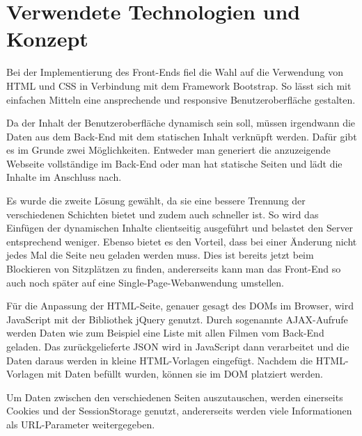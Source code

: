 \section{Verwendete Technologien und Konzept}

Bei der Implementierung des Front-Ends fiel die Wahl auf die Verwendung von \acs{HTML} und \acs{CSS} in Verbindung mit dem Framework Bootstrap.
So lässt sich mit einfachen Mitteln eine ansprechende und responsive Benutzeroberfläche gestalten.

Da der Inhalt der Benutzeroberfläche dynamisch sein soll, müssen irgendwann die Daten aus dem Back-End mit dem statischen Inhalt verknüpft werden.
Dafür gibt es im Grunde zwei Möglichkeiten.
Entweder man generiert die anzuzeigende Webseite vollständige im Back-End oder man hat statische Seiten und lädt die Inhalte im Anschluss nach.

Es wurde die zweite Lösung gewählt, da sie eine bessere Trennung der verschiedenen Schichten bietet und zudem auch schneller ist.
So wird das Einfügen der dynamischen Inhalte clientseitig ausgeführt und belastet den Server entsprechend weniger.
Ebenso bietet es den Vorteil, dass bei einer Änderung nicht jedes Mal die Seite neu geladen werden muss.
Dies ist bereits jetzt beim Blockieren von Sitzplätzen zu finden, andererseits kann man das Front-End so auch noch später auf eine Single-Page-Webanwendung umstellen.

Für die Anpassung der \acs{HTML}-Seite, genauer gesagt des \acs{DOM}s im Browser, wird Java\-Script mit der Bibliothek jQuery genutzt.
Durch sogenannte \acs{AJAX}-Aufrufe werden Daten wie zum Beispiel eine Liste mit allen Filmen vom Back-End geladen.
Das zurückgelieferte \acs{JSON} wird in JavaScript dann verarbeitet und die Daten daraus werden in kleine \acs{HTML}-Vorlagen eingefügt.
Nachdem die \acs{HTML}-Vorlagen mit Daten befüllt wurden, können sie im \acs{DOM} platziert werden.

Um Daten zwischen den verschiedenen Seiten auszutauschen, werden einerseits Cookies und der SessionStorage genutzt, andererseits werden viele Informationen als \acs{URL}-Parameter weitergegeben.
